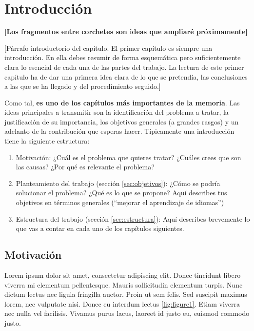 \chapter{Introducción}\label{chap:introduccion}

\textbf{[Los fragmentos entre corchetes son ideas que ampliaré próximamente]}

[Párrafo introductorio del capítulo. El primer capítulo es siempre una introducción. En ella debes resumir de forma esquemática pero suficientemente clara lo esencial de cada una de las partes del trabajo. La lectura de este primer capítulo ha de dar una primera idea clara de lo que se pretendía, las conclusiones a las que se ha llegado y del procedimiento seguido.]\par
Como tal, \textbf{es uno de los capítulos más importantes de la memoria}. Las ideas principales a transmitir son la identificación del problema a tratar, la justificación de su importancia, los objetivos generales (a grandes rasgos) y un adelanto de la contribución que esperas hacer. Típicamente una introducción tiene la siguiente estructura:\par

\begin{enumerate}
    \item Motivación: ¿Cuál es el problema que quieres tratar? ¿Cuáles crees que son las causas? ¿Por qué es relevante el problema?
    \item Planteamiento del trabajo (sección \ref{sec:objetivos}): ¿Cómo se podría solucionar el problema? ¿Qué es lo que se propone? Aquí describes tus objetivos en términos generales (``mejorar el aprendizaje de idiomas'')
    \item Estructura del trabajo (sección \ref{sec:estructura}): Aquí describes brevemente lo que vas a contar en cada uno de los capítulos siguientes.
\end{enumerate}

\section{Motivación}\label{sec:motivacion}
Lorem ipsum dolor sit amet, consectetur adipiscing elit. Donec tincidunt libero viverra mi elementum pellentesque. Mauris sollicitudin elementum turpis. Nunc dictum lectus nec ligula fringilla auctor. Proin ut sem felis. Sed suscipit maximus lorem, nec vulputate nisi. Donec eu interdum lectus \ref{fig:figure1}. Etiam viverra nec nulla vel facilisis. Vivamus purus lacus, laoreet id justo eu, euismod commodo justo.\par

